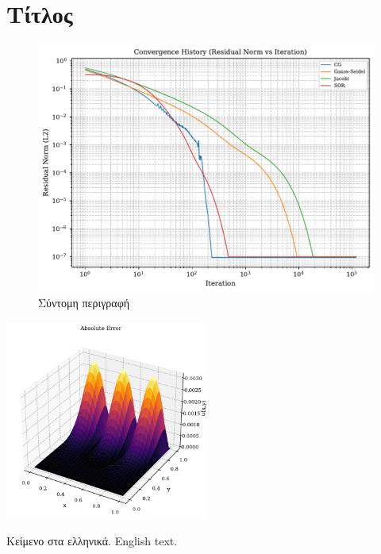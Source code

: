 \section{Τίτλος}

\begin{figure}[h!]
    \centering
    \includegraphics[width=0.60\linewidth]{doc/figures/convergence_plot.pdf}
    \caption{Σύντομη περιγραφή}
    \label{fig:placeholder}
\end{figure}

\begin{image}
    \centering
    \includegraphics[width=0.50\textwidth]{doc/images/abs_error_surface.pdf}
    \caption{Σύντομη περιγραφή}
    \label{img:example}
\end{image}

Κείμενο στα ελληνικά. English text.


